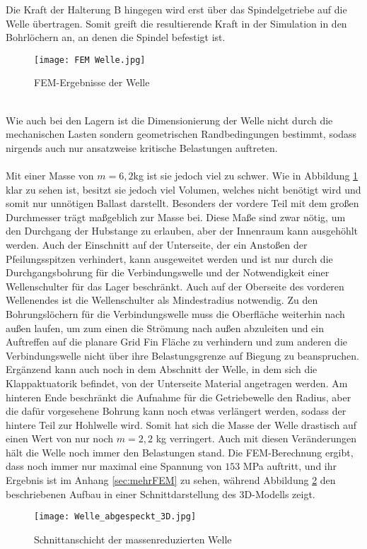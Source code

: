 Die Kraft der Halterung B hingegen wird erst über das Spindelgetriebe auf die Welle übertragen. Somit greift die resultierende Kraft in der Simulation in den Bohrlöchern an, an denen die Spindel befestigt ist.
\begin{figure}[h] 
	\centering
	\texttt{[image: FEM Welle.jpg]}
	\caption{FEM-Ergebnisse der Welle}
	\label{abb_Well_FEM}
\end{figure}\\
Wie auch bei den Lagern ist die Dimensionierung der Welle nicht durch die mechanischen Lasten sondern geometrischen Randbedingungen bestimmt, sodass nirgends auch nur ansatzweise kritische Belastungen auftreten.
\\~\\
Mit einer Masse von $m=6,2$kg ist sie jedoch viel zu schwer. Wie in Abbildung \ref{abb_Well_FEM} klar zu sehen ist, besitzt sie jedoch viel Volumen, welches nicht benötigt wird und somit nur unnötigen Ballast darstellt. Besonders der vordere Teil mit dem großen Durchmesser trägt maßgeblich zur Masse bei. Diese Maße sind zwar nötig, um den Durchgang der Hubstange zu erlauben, aber der Innenraum kann ausgehöhlt werden. Auch der Einschnitt auf der Unterseite, der ein Anstoßen der Pfeilungsspitzen verhindert, kann ausgeweitet werden und ist nur durch die Durchgangsbohrung für die Verbindungswelle und der Notwendigkeit einer Wellenschulter für das Lager beschränkt. Auch auf der Oberseite des vorderen Wellenendes ist die Wellenschulter als Mindestradius notwendig. Zu den Bohrungslöchern für die Verbindungswelle muss die Oberfläche weiterhin nach außen laufen, um zum einen die Strömung nach außen abzuleiten und ein Auftreffen auf die planare Grid Fin Fläche zu verhindern und zum anderen die Verbindungswelle nicht über ihre Belastungsgrenze auf Biegung zu beanspruchen. Ergänzend kann auch noch in dem Abschnitt der Welle, in dem sich die Klappaktuatorik befindet, von der Unterseite Material angetragen werden. Am hinteren Ende beschränkt die Aufnahme für die Getriebewelle den Radius, aber die dafür vorgesehene Bohrung kann noch etwas verlängert werden, sodass der hintere Teil zur Hohlwelle wird. Somit hat sich die Masse der Welle drastisch auf einen Wert von nur noch $m= 2,2$ kg verringert. Auch mit diesen Veränderungen hält die Welle noch immer den Belastungen stand. Die FEM-Berechnung ergibt, dass noch immer nur maximal eine Spannung von $153$ MPa auftritt, und ihr Ergebnis ist im Anhang \ref{sec:mehrFEM} zu sehen, während Abbildung \ref{abb_abgespeckt} den beschriebenen Aufbau in einer Schnittdarstellung des 3D-Modells zeigt.
\begin{figure}[h] 
	\centering
	\texttt{[image: Welle\_abgespeckt\_3D.jpg]}
	\caption{Schnittanschicht der massenreduzierten Welle}
	\label{abb_abgespeckt}
\end{figure}\\

